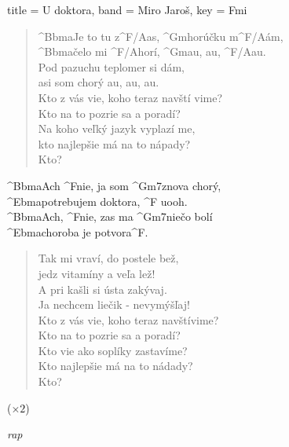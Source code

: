 \begin{song}[
    remember-chords = true ,
    verse/numbered = true ,
    transpose-capo = true 
  ]{
    title = U doktora,
    band = Miro Jaroš,
    key  = Fmi
  }
  
  	\begin{verse}
  	^{Bbma}Je to tu z^{F/A}as, ^{Gm}horúčku m^{F/A}ám, \\ 
  	^{Bbma}čelo mi ^{F/A}horí, ^{Gm}au, au, ^{F/A}au. \\ 
  	Pod pazuchu teplomer si dám, \\ 
  	asi som chorý au, au, au. \\ 
  	Kto z vás vie, koho teraz navští vime? \\ 
  	Kto na to pozrie sa a poradí? \\
  	Na koho veľký jazyk vyplazí me, \\ 
  	kto najlepšie má na to nápady? \\ 
  	Kto?
  	\end{verse}
  	
  	\begin{chorus}
  	^{Bbma}Ach ^{F}nie, ja som ^{Gm7}znova chorý, \\
  	^{Ebma}potrebujem doktora, ^{F} uooh. \\
  	^{Bbma}Ach, ^{F}nie, zas ma ^{Gm7}niečo bolí \\
  	^{Ebma}choroba je potvora^{F}.
  	\end{chorus}
  	
	\begin{verse}
  	Tak mi vraví, do postele bež, \\
	jedz vitamíny a veľa lež! \\
	A pri kašli si ústa zakývaj. \\ 
	Ja nechcem liečik - nevymýšľaj! \\
	Kto z vás vie, koho teraz navštívime? \\ 
	Kto na to pozrie sa a poradí? \\
	Kto vie ako soplíky zastavíme? \\
	Kto najlepšie má na to nádady? \\
	Kto?
  	\end{verse}
  	
  	\begin{chorus}
    ($\times2$)
  	\end{chorus}
  	
  	\begin{verse*}
  	\textit{rap}
  	\end{verse*}
  	

\end{song}

